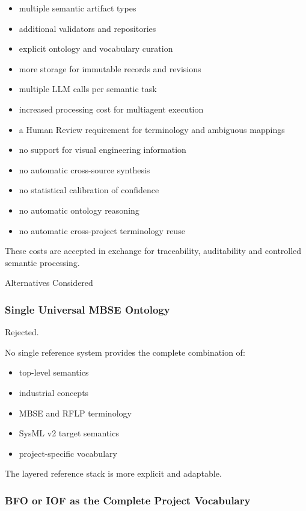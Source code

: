 \begin{itemize}
\tightlist
\item
  multiple semantic artifact types
\item
  additional validators and repositories
\item
  explicit ontology and vocabulary curation
\item
  more storage for immutable records and revisions
\item
  multiple LLM calls per semantic task
\item
  increased processing cost for multiagent execution
\item
  a Human Review requirement for terminology and ambiguous mappings
\item
  no support for visual engineering information
\item
  no automatic cross-source synthesis
\item
  no statistical calibration of confidence
\item
  no automatic ontology reasoning
\item
  no automatic cross-project terminology reuse
\end{itemize}

These costs are accepted in exchange for traceability, auditability and controlled semantic processing.

Alternatives Considered

\hypertarget{single-universal-mbse-ontology}{%
\subsubsection{Single Universal MBSE Ontology}\label{single-universal-mbse-ontology}}

Rejected.

No single reference system provides the complete combination of:

\begin{itemize}
\tightlist
\item
  top-level semantics
\item
  industrial concepts
\item
  MBSE and RFLP terminology
\item
  SysML v2 target semantics
\item
  project-specific vocabulary
\end{itemize}

The layered reference stack is more explicit and adaptable.

\hypertarget{bfo-or-iof-as-the-complete-project-vocabulary}{%
\subsubsection{BFO or IOF as the Complete Project Vocabulary}\label{bfo-or-iof-as-the-complete-project-vocabulary}}

